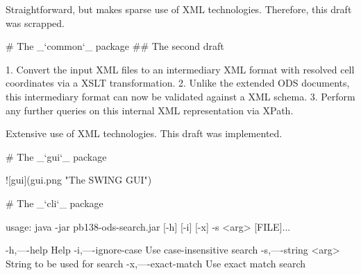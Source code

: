 \documentclass{beamer}
\let\acro\MakeUppercase
\begin{document}
\begin{markdown*}
\begin{darkframes}
\begin{frame}
Straightforward, but makes sparse use of \acro{xml} technologies. Therefore,
this draft was scrapped.

\end{frame}
\begin{frame}

# The _`common`_ package
## The second draft

 1. Convert the input \acro{xml} files to an intermediary \acro{xml} format
    with resolved cell coordinates via a \acro{xslt} transformation.
 2. Unlike the extended \acro{ods} documents, this intermediary format can
    now be validated against a \acro{xml} schema.
 3. Perform any further queries on this internal \acro{xml} representation
    via XPath.

Extensive use of \acro{xml} technologies. This draft was implemented.

\end{frame}
\begin{frame}

# The _`gui`_ package

\vspace{-1em}

 ![gui](gui.png "The \acro{swing} \acro{gui}")

\end{frame}
\begin{frame}

# The _`cli`_ package

    usage: java -jar pb138-ods-search.jar
                [-h] [-i] [-x] -s <arg> [FILE]...

       -h,----help             Help
       -i,----ignore-case      Use case-insensitive search
       -s,----string <arg>     String to be used for search
       -x,----exact-match      Use exact match search

\end{frame}
\end{darkframes}
\end{markdown*}
\end{document}
